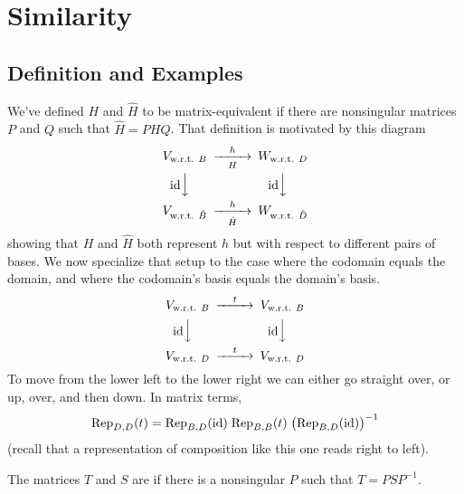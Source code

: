 \section{Similarity}

\subsection{Definition and Examples}
We've defined \( H \) and \( \hat{H} \) to be
matrix-equivalent if there are nonsingular matrices \( P \) and \( Q \)
such that \( \hat{H}=PHQ \).
That definition is motivated by this diagram
\begin{equation*}
  \begin{CD}
    V_\wrt{B}                   @>h>H>        W_\wrt{D}       \\
    @V{\scriptstyle\identity} VV              @V{\scriptstyle\identity} VV \\
    V_\wrt{\hat{B}}             @>h>\hat{H}>  W_\wrt{\hat{D}}
  \end{CD}
\end{equation*}
showing that $H$ and $\hat{H}$ both represent $h$ but with respect to different
pairs of bases.
We now specialize that setup to the case
where the codomain equals the domain, and
where the codomain's basis equals the domain's basis.
\begin{equation*}
  \begin{CD}
    V_\wrt{B}                   @>t>>        V_\wrt{B}       \\
    @V{\scriptstyle\identity} VV              @V{\scriptstyle\identity} VV \\
    V_\wrt{D}                   @>t>>        V_\wrt{D}
  \end{CD}
\end{equation*}
To move from the lower left to the lower right we can either go straight
over, or up, over, and then down. 
In matrix terms, 
\begin{equation*}
\rep{t}{D,D}
  =\rep{\identity}{B,D}\;\rep{t}{B,B}\;\bigl(\rep{\identity}{B,D}\bigr)^{-1}
\end{equation*}
(recall that a representation of composition like this one reads right to
left).

\begin{definition}
The matrices  \( T \) and $S$ are 
%
if there is a nonsingular \( P \) such that
$
  T=PSP^{-1}
$.
\end{definition}

